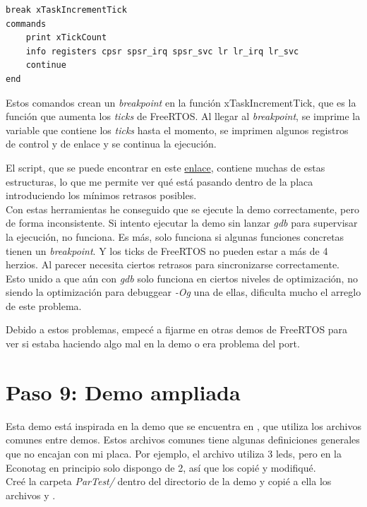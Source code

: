 \begin{verbatim}
break xTaskIncrementTick
commands
    print xTickCount
    info registers cpsr spsr_irq spsr_svc lr lr_irq lr_svc
    continue
end
\end{verbatim}

Estos comandos crean un \emph{breakpoint} en la función xTaskIncrementTick, que es la función que aumenta los \emph{ticks} de FreeRTOS. Al llegar al \emph{breakpoint}, se imprime la variable que contiene los \emph{ticks} hasta el momento, se imprimen algunos registros de control y de enlace y se continua la ejecución.

El script, que se puede encontrar en este \href{https://github.com/epaubert/FreeRTOS-TFG/blob/main/FreeRTOS/Demo/ARM7_MC13224V_GCC/break.gdb}{enlace}, contiene muchas de estas estructuras, lo que me permite ver qué está pasando dentro de la placa introduciendo los mínimos retrasos posibles.\\

Con estas herramientas he conseguido que se ejecute la demo correctamente, pero de forma inconsistente. Si intento ejecutar la demo sin lanzar \emph{gdb} para supervisar la ejecución, no funciona. Es más, solo funciona si algunas funciones concretas tienen un \emph{breakpoint}. Y los ticks de FreeRTOS no pueden estar a más de 4 herzios. Al parecer necesita ciertos retrasos para sincronizarse correctamente. Esto unido a que aún con \emph{gdb} solo funciona en ciertos niveles de optimización, no siendo la optimización para debuggear \emph{-Og} una de ellas, dificulta mucho el arreglo de este problema. 

Debido a estos problemas, empecé a fijarme en otras demos de FreeRTOS para ver si estaba haciendo algo mal en la demo o era problema del port.

\section{Paso 9: Demo ampliada}
Esta demo está inspirada en la demo que se encuentra en , que utiliza los archivos comunes entre demos. Estos archivos comunes tiene algunas definiciones generales que no encajan con mi placa. Por ejemplo, el archivo  utiliza 3 leds, pero en la Econotag en principio solo dispongo de 2, así que los copié y modifiqué.\\

Creé la carpeta \emph{ParTest/} dentro del directorio de la demo y copié a ella los archivos  y .

